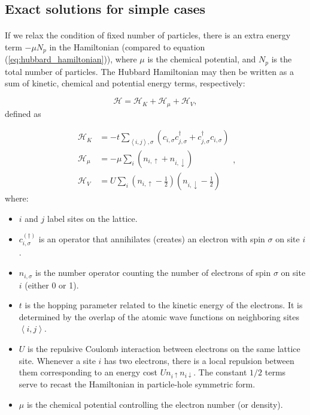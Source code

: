 \subsection{Exact solutions for simple cases}\label{exactSolutions}\paragraph{}

If we relax the condition of fixed number of particles, there is an extra energy term $-\mu N_p$ in the Hamiltonian (compared to equation (\ref{eq:hubbard_hamiltonian})), where $\mu$ is the chemical potential, and $N_p$ is the total number of particles. The Hubbard Hamiltonian may then be written as a sum of kinetic, chemical and potential energy terms, respectively:

\begin{equation}\label{eq:hubbard}
\mathcal{H} = \mathcal{H}_K + \mathcal{H}_\mu + \mathcal{H}_V ,
\end{equation}
defined as

\begin{equation}\label{eq:def_energies}
\begin{split}
\mathcal{H}_K &= -t \sum_{\left\langle i, j \right \rangle, \sigma} ( c_{i,\sigma} c_{j,\sigma}^\dagger + c_{j,\sigma}^\dagger c_{i,\sigma} ) \\
\mathcal{H}_\mu &= -\mu \sum_i ( n_{i,\uparrow} + n_{i,\downarrow} ) \\
\mathcal{H}_V &= U \sum_{i} ( n_{i,\uparrow} - \frac{1}{2} ) ( n_{i,\downarrow} - \frac{1}{2} )
\end{split} ,
\end{equation}
where:

\begin{itemize}
\item $i$ and $j$ label sites on the lattice.
\item $c_{i,\sigma}^{(\dagger)}$ is an operator that annihilates (creates) an electron with spin $\sigma$ on site $i$.
\item $n_{i,\sigma}$ is the number operator counting the number of electrons of spin $\sigma$ on site $i$ (either 0 or 1).
\item $t$ is the hopping parameter related to the kinetic energy of the electrons. It is determined by the overlap of the atomic wave functions on neighboring sites $\left\langle i, j \right\rangle$.
\item $U$ is the repulsive Coulomb interaction between electrons on the same lattice site. Whenever a site $i$ has two electrons, there is a local repulsion between them corresponding to an energy cost $U n_{i \uparrow} n_{i \downarrow}$. The constant $1/2$ terms serve to recast the Hamiltonian in particle-hole symmetric form.
\item $\mu$ is the chemical potential controlling the electron number (or density).
\end{itemize}

